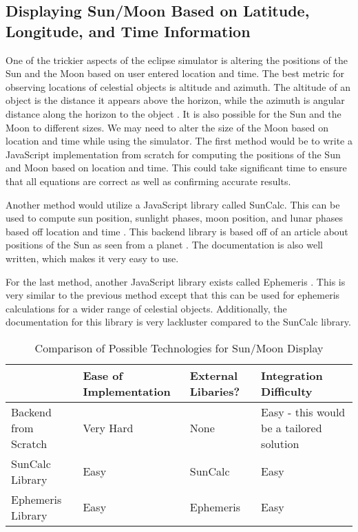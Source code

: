 \documentclass[10pt, onecolumn, draftclsnofoot, letterpaper, compsoc]{IEEEtran}
\begin{document}
\subsection{Displaying Sun/Moon Based on Latitude, Longitude, and Time
 Information}

One of the trickier aspects of the eclipse simulator is altering the positions
of the Sun and the Moon based on user entered location and time. The best metric
for observing locations of celestial objects is altitude and azimuth. The
altitude of an object is the distance it appears above the horizon, while the
azimuth is angular distance along the horizon to the object \cite{ALTAZI}.
It is also possible for the Sun and the Moon to different sizes. We may need
to alter the size of the Moon based on location and time while using the
simulator. The first method would be to write a JavaScript implementation
from scratch for computing the positions of the Sun and Moon based on
location and time. This could take significant time to ensure that all
equations are correct as well as confirming accurate results.

Another method would utilize a JavaScript library called SunCalc. This can be
used to compute sun position, sunlight phases, moon position, and lunar phases
based off location and time \cite{SunCalc}. This backend library is based off
of an article about positions of the Sun as seen from a planet \cite{AST}.
The documentation is also well written, which makes it very easy to use.

For the last method, another JavaScript library exists called Ephemeris
\cite{Ephem}. This is very similar to the previous method except that this
can be used for ephemeris calculations for a wider range of celestial objects.
Additionally, the documentation for this library is very lackluster compared
to the SunCalc library.

\begin{table}[h]
\centering
\caption{Comparison of Possible Technologies for Sun/Moon Display}
\begin{tabular}{|p{3.15cm}|p{3.15cm}|p{3.15cm}|p{3.15cm}|}
\cline{4-4}

\hline  & Ease of Implementation & External Libaries? & Integration Difficulty
 \\ \hline

Backend from Scratch & Very Hard & None & Easy - this would be a tailored
solution \\ \hline

SunCalc Library & Easy & SunCalc & Easy \\ \hline

Ephemeris Library & Easy & Ephemeris & Easy \\ \hline

\end{tabular}
\label{table:Jake2}
\end{table}
\end{document}
